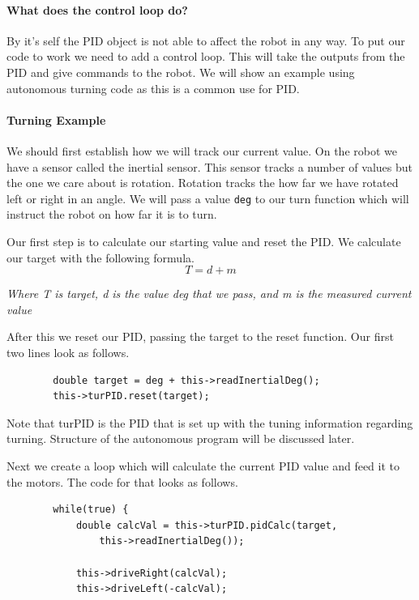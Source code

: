 \documentclass[12pt]{article}
\begin{document}
\paragraph{What does the control loop do?}
    By it's self the PID object is not able to affect the robot in any way. To put our code to work we need to add a control loop. This will take the outputs from the PID and give commands to the robot. We will show an example using autonomous turning code as this is a common use for PID.

\paragraph{Turning Example}

    We should first establish how we will track our current value. On the robot we have a sensor called the inertial sensor. This sensor tracks a number of values but the one we care about is rotation. Rotation tracks the how far we have rotated left or right in an angle. We will pass a value \verb|deg| to our turn function which will instruct the robot on how far it is to turn.

    Our first step is to calculate our starting value and reset the PID. We calculate our target with the following formula.
    $$ T = d + m $$
    \begin{center}
     \em{Where T is target, d is the value deg that we pass, and m is the measured current value}
    \end{center}

    After this we reset our PID, passing the target to the reset function. Our first two lines look as follows.

    \begin{verbatim}
        double target = deg + this->readInertialDeg();
        this->turPID.reset(target);
    \end{verbatim}

    Note that turPID is the PID that is set up with the tuning information regarding turning. Structure of the autonomous program will be discussed later.

    Next we create a loop which will calculate the current PID value and feed it to the motors. The code for that looks as follows.

    \begin{verbatim}
        while(true) {
            double calcVal = this->turPID.pidCalc(target,
                this->readInertialDeg());

            this->driveRight(calcVal);
            this->driveLeft(-calcVal);
    \end{verbatim}
\end{document}

